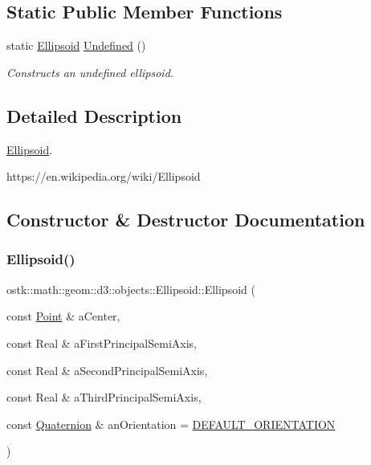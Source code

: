 \subsection*{Static Public Member Functions}
\begin{DoxyCompactItemize}
\item 
static \hyperlink{classostk_1_1math_1_1geom_1_1d3_1_1objects_1_1_ellipsoid}{Ellipsoid} \hyperlink{classostk_1_1math_1_1geom_1_1d3_1_1objects_1_1_ellipsoid_a607399f86f75b9f2c97f05802b0974b2}{Undefined} ()
\begin{DoxyCompactList}\small\item\em Constructs an undefined ellipsoid. \end{DoxyCompactList}\end{DoxyCompactItemize}


\subsection{Detailed Description}
\hyperlink{classostk_1_1math_1_1geom_1_1d3_1_1objects_1_1_ellipsoid}{Ellipsoid}. 

https\+://en.wikipedia.\+org/wiki/\+Ellipsoid 

\subsection{Constructor \& Destructor Documentation}
\mbox{\label{classostk_1_1math_1_1geom_1_1d3_1_1objects_1_1_ellipsoid_a106c71abf9503f3d06b2613c1c7e9d65}} 
\subsubsection{\texorpdfstring{Ellipsoid()}{Ellipsoid()}}
{\footnotesize\ttfamily ostk\+::math\+::geom\+::d3\+::objects\+::\+Ellipsoid\+::\+Ellipsoid (\begin{DoxyParamCaption}\item[{const \hyperlink{classostk_1_1math_1_1geom_1_1d3_1_1objects_1_1_point}{Point} \&}]{a\+Center,  }\item[{const Real \&}]{a\+First\+Principal\+Semi\+Axis,  }\item[{const Real \&}]{a\+Second\+Principal\+Semi\+Axis,  }\item[{const Real \&}]{a\+Third\+Principal\+Semi\+Axis,  }\item[{const \hyperlink{classostk_1_1math_1_1geom_1_1d3_1_1trf_1_1rot_1_1_quaternion}{Quaternion} \&}]{an\+Orientation = {\ttfamily \hyperlink{_ellipsoid_8hpp_a5c684aeaeb24d197904b5a34839d2dd9}{D\+E\+F\+A\+U\+L\+T\+\_\+\+O\+R\+I\+E\+N\+T\+A\+T\+I\+ON}} }\end{DoxyParamCaption})}



